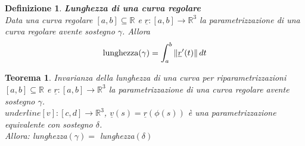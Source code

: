 \documentclass{scrreprt}
\newtheorem{defn}{Definizione}
\newenvironment{definition}{\begin{mdframed}[backgroundcolor=Ivory2]\begin{defn}}{\end{defn}\end{mdframed}}
\newtheorem{teorema}{Teorema}
\newenvironment{thm}{\begin{mdframed}[backgroundcolor=Ivory2]\begin{teorema}}{\end{teorema}\end{mdframed}}
\begin{document}
\begin{definition} \textbf{Lunghezza di una curva regolare}\\
	Data una curva regolare $[a,b] \subseteq \mathbb{R}$ e $\underline{r}: [a,b] \rightarrow \mathbb{R}^3$ la parametrizzazione di una curva regolare avente sostegno $\gamma$. Allora
	\begin{equation}
		\textnormal{lunghezza}(\gamma) = \int_a^b \left\lVert \underline{r}'(t) \right\rVert dt
	\end{equation}
\end{definition}

\begin{thm} Invarianza della lunghezza di una curva per riparametrizzazioni\\
	$[a,b] \subseteq \mathbb{R}$ e $\underline{r}: [a,b] \rightarrow \mathbb{R}^3$ la parametrizzazione di una curva regolare avente sostegno $\gamma$.\\
	$underline[v]: [c,d] \rightarrow \mathbb{R}^3$, $\underline{v}(s) = \underline{r}(\phi(s))$ è una parametrizzazione equivalente con sostegno $\delta$.\\
	Allora: lunghezza$(\gamma) =$ lunghezza$(\delta)$
\end{thm}
\end{document}
